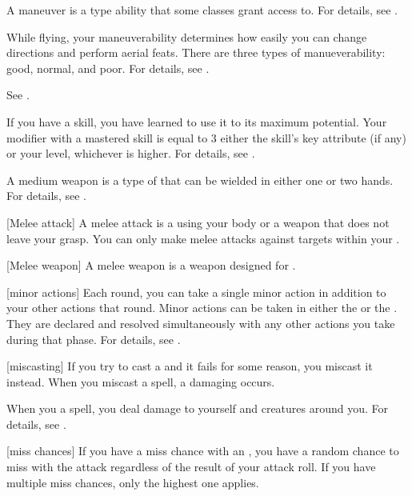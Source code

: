  A maneuver is a type  ability that some classes grant access to.
For details, see .

 While flying, your maneuverability determines how easily you can change directions and perform aerial feats.
There are three types of manueverability: good, normal, and poor.
For details, see .

 See .

 If you have  a skill, you have learned to use it to its maximum potential.
Your modifier with a mastered skill is equal to 3 \add either the skill's key attribute (if any) or your level, whichever is higher.
For details, see .

 A medium weapon is a type of  that can be wielded in either one or two hands.
For details, see .

[Melee attack] A melee attack is a  using your body or a weapon that does not leave your grasp.
You can only make melee attacks against targets within your .

[Melee weapon] A melee weapon is a weapon designed for .

[minor actions] Each round, you can take a single minor action in addition to your other actions that round.
Minor actions can be taken in either the  or the .
They are declared and resolved simultaneously with any other actions you take during that phase.
For details, see .

[miscasting] If you try to cast a  and it fails for some reason, you miscast it instead.
When you miscast a spell, a damaging  occurs.

 When you  a spell, you deal damage to yourself and creatures around you.
For details, see .

[miss chances] If you have a miss chance with an , you have a random chance to miss with the attack regardless of the result of your attack roll.
If you have multiple miss chances, only the highest one applies.

